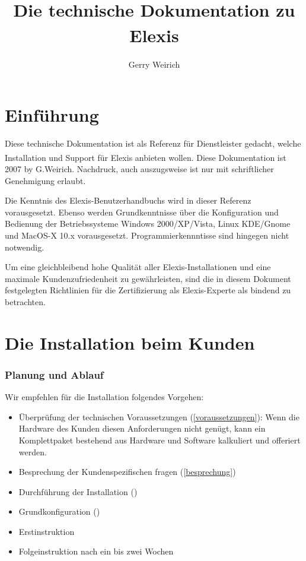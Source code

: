 \documentclass[paper=a4,BCOR8.25mm,twoside]{scrartcl}
\author{Gerry Weirich}
\title{Die technische Dokumentation zu Elexis\textsuperscript{\textregistered}}
\begin{document}
\maketitle

\tableofcontents
\part{Einführung}

Diese technische Dokumentation ist als Referenz für Dienstleister gedacht, welche Installation und Support für Elexis\textsuperscript{\textregistered} anbieten wollen. Diese Dokumentation ist \textsuperscript{\textcopyright} 2007 by G.Weirich. Nachdruck, auch auszugsweise ist nur mit schriftlicher Genehmigung erlaubt.

\bigskip

Die Kenntnis des Elexis-Benutzerhandbuchs wird in dieser Referenz vorausgesetzt. Ebenso werden Grundkenntnisse über die Konfiguration und Bedienung der Betriebssysteme Windows 2000/XP/Vista, Linux KDE/Gnome und MacOS-X 10.x vorausgesetzt. Programmierkennntisse sind hingegen nicht notwendig.

\bigskip

Um eine gleichbleibend hohe Qualität aller Elexis-Installationen und eine maximale Kundenzufriedenheit zu gewährleisten, sind die in diesem Dokument festgelegten Richtlinien für die Zertifizierung als Elexis-Experte als bindend zu betrachten.

\part{Die Installation beim Kunden}
\section{Planung und Ablauf}
Wir empfehlen für die Installation folgendes Vorgehen:
\begin{itemize}
    \item Überprüfung der technischen Voraussetzungen (\ref{voraussetzungen}): Wenn die Hardware des Kunden diesen Anforderungen nicht genügt, kann ein Komplettpaket bestehend aus Hardware und Software kalkuliert und offeriert werden.
    \item Besprechung der Kundenspezifischen fragen (\ref{besprechung})
    \item Durchführung der Installation (\label{ablauf})
    \item Grundkonfiguration (\label{config})
    \item Erstinstruktion
    \item Folgeinstruktion nach ein bis zwei Wochen
\end{itemize}
\end{document}
